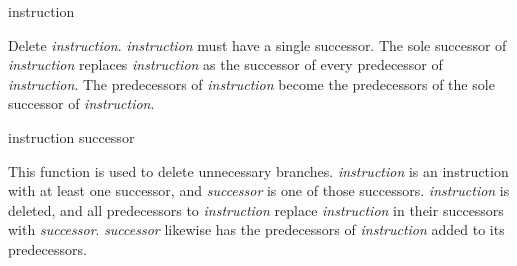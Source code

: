  {instruction}

Delete \textit{instruction}.  \textit{instruction} must have a single
successor.  The sole successor of \textit{instruction} replaces
\textit{instruction} as the successor of every predecessor of
\textit{instruction}.  The predecessors of \textit{instruction} become
the predecessors of the sole successor of \textit{instruction}.

 {instruction successor}

This function is used to delete unnecessary branches.
\textit{instruction} is an instruction with at least one successor,
and \textit{successor} is one of those successors. \textit{instruction}
is deleted, and all predecessors to \textit{instruction} replace
\textit{instruction} in their successors with \textit{successor}.
\textit{successor} likewise has the predecessors of \textit{instruction}
added to its predecessors.

